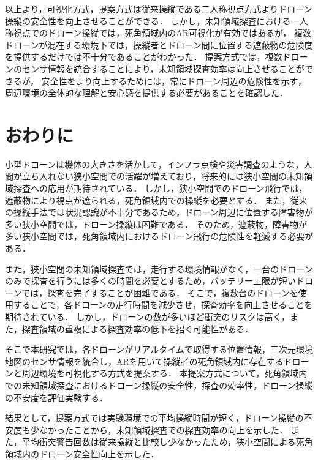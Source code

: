 \documentclass[a4paper,11pt]{ujreport}
\begin{document}
以上より，可視化方式，提案方式は従来操縦である二人称視点方式よりドローン操縦の安全性を向上させることができる．
しかし，未知領域探査における一人称視点でのドローン操縦では，死角領域内のAR可視化が有効ではあるが，
複数ドローンが混在する環境下では，操縦者とドローン間に位置する遮蔽物の危険度を提供するだけでは不十分であることがわかった．
提案方式では，複数ドローンのセンサ情報を統合することにより，未知領域探査効率は向上させることができるが，
安全性をより向上するためには，常にドローン周辺の危険性を示す，周辺環境の全体的な理解と安心感を提供する必要があることを確認した．





\chapter{おわりに}
\label{chap:Conclusion}

小型ドローンは機体の大きさを活かして，インフラ点検や災害調査のような，人間が立ち入れない狭小空間での活躍が増えており，将来的には狭小空間の未知領域探査への応用が期待されている．
しかし，狭小空間でのドローン飛行では，遮蔽物により視点が遮られる，死角領域内での操縦を必要とする．
また，従来の操縦手法では状況認識が不十分であるため，ドローン周辺に位置する障害物が多い狭小空間では，ドローン操縦は困難である．
そのため，遮蔽物，障害物が多い狭小空間では，死角領域内におけるドローン飛行の危険性を軽減する必要がある．

また，狭小空間の未知領域探査では，走行する環境情報がなく，一台のドローンのみで探査を行うには多くの時間を必要とするため，バッテリー上限が短いドローンでは，探査を完了することが困難である．
そこで，複数台のドローンを使用することで，各ドローンの走行時間を減少させ，探査効率を向上させることを期待されている．
しかし，ドローンの数が多いほど衝突のリスクは高く，また，探査領域の重複による探査効率の低下を招く可能性がある．

そこで本研究では，各ドローンがリアルタイムで取得する位置情報，三次元環境地図のセンサ情報を統合し，ARを用いて操縦者の死角領域内に存在するドローンと周辺環境を可視化する方式を提案する．
本提案方式について，死角領域内での未知領域探査におけるドローン操縦の安全性，探査の効率性，ドローン操縦の不安度を評価実験する．

結果として，提案方式では実験環境での平均操縦時間が短く，ドローン操縦の不安度も少なかったことから，未知領域探査での探査効率の向上を示した．
また，平均衝突警告回数は従来操縦と比較し少なかったため，狭小空間による死角領域内のドローン安全性向上を示した．\\
\end{document}
